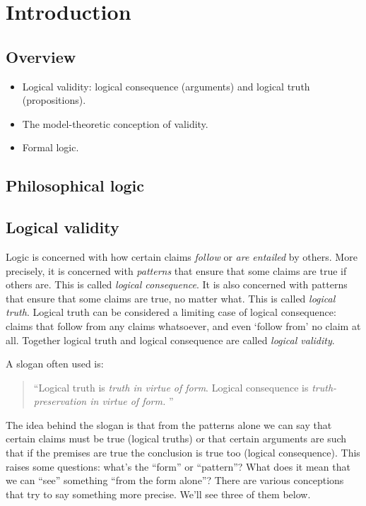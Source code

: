 \documentclass[../../../include/open-logic-part]{subfiles}
\begin{document}
\chapter{Introduction}

\begin{overview}

\section*{Overview}

\begin{itemize} 
	\item Logical validity: logical consequence
(arguments) and logical truth (propositions). 
	\item The model-theoretic conception of validity. 
	\item Formal logic.
\end{itemize}

\end{overview}

\section{Philosophical logic}

\section{Logical validity}

Logic is concerned with how certain claims \emph{follow} or \emph{are
entailed} by others. More precisely, it is concerned with
\emph{patterns} that ensure that some claims are true if others are.
This is called \emph{logical consequence}. It is also concerned with
patterns that ensure that some claims are true, no matter what. This
is called \emph{logical truth}. Logical truth can be considered a
limiting case of logical consequence: claims that follow from any
claims whatsoever, and even `follow from' no claim at all. Together
logical truth and logical consequence are called \emph{logical
validity}.

A slogan often used is: \begin{quote} ``Logical truth is \emph{truth
in virtue of form}. Logical consequence is \emph{truth-preservation in
virtue of form. }''  \end{quote}

The idea behind the slogan is that from the patterns alone we can say
that certain claims must be true (logical truths) or that certain
arguments are such that if the premises are true the conclusion is
true too (logical consequence). This raises some questions: what's the
``form'' or ``pattern''? What does it mean that we can ``see''
something ``from the form alone''? There are various conceptions that
try to say something more precise. We'll see three of them below.  
\end{document}
